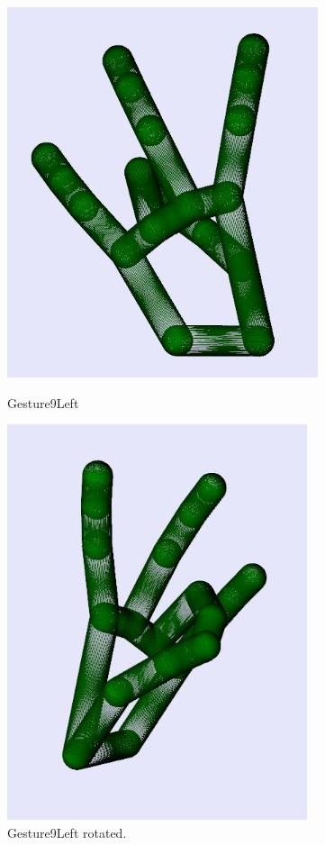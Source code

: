 \begin{figure}[H]
    \centering
    \begin{minipage}{0.5\textwidth}
        \centering
        \includegraphics[scale=.75]{Figures/gesture9Left.JPG} 
        \caption[Gesture9Left]{Gesture9Left}
		\label{fig:Gesture9Left}
    \end{minipage}\hfill
    \begin{minipage}{0.5\textwidth}
        \centering
        \includegraphics[scale=.75]{Figures/gesture9Left_rotated.JPG}
        \caption[Gesture9Left Rotated]{Gesture9Left rotated.}
        \label{fig:Gesture9Left_rotated}
    \end{minipage}
\end{figure}

